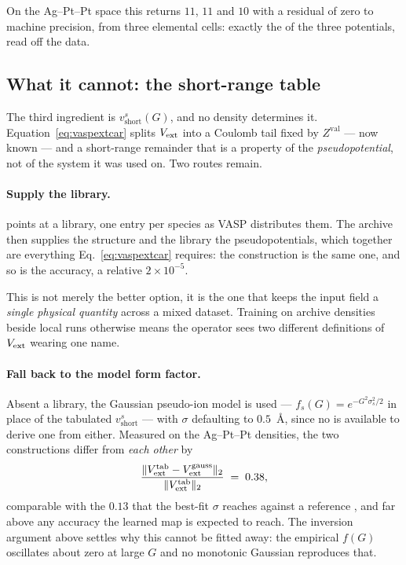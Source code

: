 On the Ag--Pt--Pt space this returns $11$, $11$ and $10$ with a residual of
zero to machine precision, from three elemental cells: exactly the 
of the three  potentials, read off the data.

\subsection{What it cannot: the short-range table}

The third ingredient is $v^s_{\mathrm{short}}(G)$, and no density determines it.
Equation~\eqref{eq:vaspextcar} splits $V_{\mathrm{ext}}$ into a Coulomb tail fixed by
$Z^{\mathrm{val}}$ --- now known --- and a short-range remainder that is a
property of the \emph{pseudopotential}, not of the system it was used on. Two
routes remain.

\paragraph{Supply the library.}  points at a
 library, one entry per species as VASP distributes them. The
archive then supplies the structure and the library the pseudopotentials, which
together are everything Eq.~\eqref{eq:vaspextcar} requires: the construction is
the same one, and so is the accuracy, a relative $2\times10^{-5}$.

This is not merely the better option, it is the one that keeps the input field a
\emph{single physical quantity} across a mixed dataset. Training on archive
densities beside local runs otherwise means the operator sees two different
definitions of $V_{\mathrm{ext}}$ wearing one name.

\paragraph{Fall back to the model form factor.} Absent a library, the Gaussian
pseudo-ion model is used --- $f_s(G)=e^{-G^2\sigma_s^2/2}$ in place of the
tabulated $v^s_{\mathrm{short}}$ --- with $\sigma$ defaulting to $0.5$~\AA{},
since no  is available to derive one from either. Measured on the
Ag--Pt--Pt densities, the two constructions differ from \emph{each other} by
\begin{equation}
  \frac{\lVert V_{\mathrm{ext}}^{\mathrm{tab}} - V_{\mathrm{ext}}^{\mathrm{gauss}} \rVert_2}
       {\lVert V_{\mathrm{ext}}^{\mathrm{tab}} \rVert_2} \;=\; 0.38 ,
\end{equation}
comparable with the $0.13$ that the best-fit $\sigma$ reaches against a
reference , and far above any accuracy the learned map is expected
to reach. The inversion argument above settles why this cannot be fitted away:
the empirical $f(G)$ oscillates about zero at large $G$ and no monotonic
Gaussian reproduces that.

